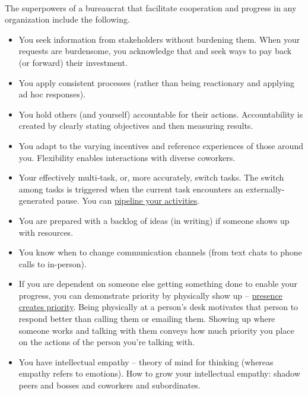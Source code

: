 \ \\

The superpowers of a bureaucrat that facilitate cooperation and progress in any organization include the following.
\begin{itemize}
\item You seek information from stakeholders without burdening them. When your requests are burdensome, you acknowledge that and seek ways to pay back (or forward) their investment.
\item You apply consistent processes (rather than being reactionary and applying ad hoc responses).
\item You hold others (and yourself) accountable for their actions. Accountability is created by clearly stating objectives and then measuring results.
\item You adapt to the varying incentives and reference experiences of those around you. Flexibility enables interactions with diverse coworkers. 
    \item Your effectively multi-task, or, more accurately, switch tasks. The switch among tasks is triggered when the current task encounters an externally-generated pause. You can \href{https://en.wikipedia.org/wiki/Pipeline_(computing)#Concept_and_motivation}{pipeline your activities}.
    \item You are prepared with a backlog of ideas (in writing) if someone shows up with resources.
    \item You know when to change communication channels (from text chats to phone calls to in-person). 
    \item If you are dependent on someone else getting something done to enable your progress, you can demonstrate priority by physically show up -- \underline{presence creates priority}. 
    Being physically at a person's desk motivates that person to respond better than calling them or emailing them. Showing up where someone works and talking with them conveys how much priority you place on the actions of the person you're talking with.
    \item You have intellectual empathy -- theory of mind for thinking (whereas empathy refers to emotions). How to grow your intellectual empathy: shadow peers and bosses and coworkers and subordinates.

\end{itemize}
